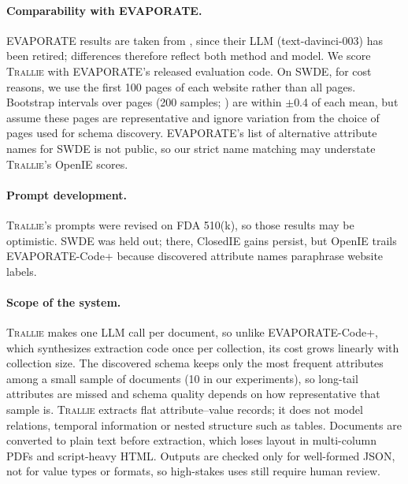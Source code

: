 
\paragraph{Comparability with EVAPORATE.}
EVAPORATE results are taken from \citet{arora2023evaporate}, since their LLM
(text-davinci-003) has been retired; differences therefore reflect both method and model.
We score \textsc{Trallie} with EVAPORATE's released evaluation code.
On SWDE, for cost reasons, we use the first 100 pages of each website rather than all
pages. Bootstrap intervals over pages (200 samples; \citealp{efron1993bootstrap}) are
within $\pm$0.4 of each mean, but assume these pages are representative and ignore
variation from the choice of pages used for schema discovery.
EVAPORATE's list of alternative attribute names for SWDE is not public, so our strict
name matching may understate \textsc{Trallie}'s OpenIE scores.

\paragraph{Prompt development.}
\textsc{Trallie}'s prompts were revised on FDA 510(k), so those results may be
optimistic. SWDE was held out; there, ClosedIE gains persist, but OpenIE trails
EVAPORATE-Code+ because discovered attribute names paraphrase website labels.

\paragraph{Scope of the system.}
\textsc{Trallie} makes one LLM call per document, so unlike EVAPORATE-Code+, which
synthesizes extraction code once per collection, its cost grows linearly with
collection size. The discovered schema keeps only the most frequent attributes among a
small sample of documents (10 in our experiments), so long-tail attributes are missed
and schema quality depends on how representative that sample is. \textsc{Trallie}
extracts flat attribute--value records; it does not model relations, temporal
information or nested structure such as tables. Documents are converted to plain text
before extraction, which loses layout in multi-column PDFs and script-heavy HTML.
Outputs are checked only for well-formed JSON, not for value types or formats, so
high-stakes uses still require human review.
